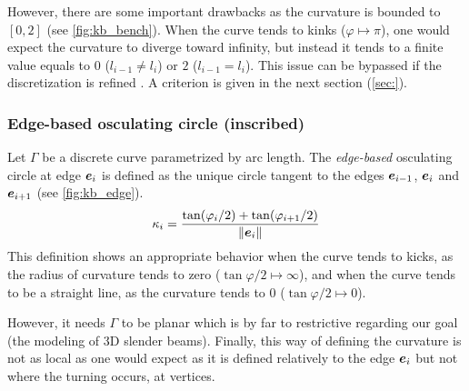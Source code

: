 However, there are some important drawbacks as the curvature is bounded to $[0,2]$ (see \cref{fig:kb_bench}). When the curve tends to kinks ($\varphi \mapsto \pi$), one would expect the curvature to diverge toward infinity, but instead it tends to a finite value equals to $0$ ($l_{i-1} \neq l_i$) or $2$ ($l_{i-1} = l_i$). This issue can be bypassed if the discretization is refined . A criterion is given in the next section (\cref{sec:}).


\subsubsection{Edge-based osculating circle (inscribed)}
Let $\Gamma$ be a discrete curve parametrized by arc length. The \emph{edge-based} osculating circle at edge $\boldsymbol{e}_{i}$ is defined as the unique circle tangent to the edges $\boldsymbol{e}_{i-1}$, $\boldsymbol{e}_{i}$ and $\boldsymbol{e}_{i+1}$ (see \cref{fig:kb_edge}).
\begin{equation}
	\kappa_i = \frac{\tan(\varphi_i/2) + \tan(\varphi_{i+1}/2)}{\lVert\boldsymbol{e}_{i}\rVert}
\label{eq:def_kb_edge}
\end{equation}
This definition shows an appropriate behavior when the curve tends to kicks, as the radius of curvature tends to zero ($\tan \varphi/2 \mapsto \infty$), and when the curve tends to be a straight line, as the curvature tends to $0$ ($\tan \varphi/2 \mapsto 0$).

However, it needs $\Gamma$ to be planar which is by far to restrictive regarding our goal (the modeling of 3D slender beams). Finally, this way of defining the curvature is not as local as one would expect as it is defined relatively to the edge $\boldsymbol{e}_{i}$ but not where the turning occurs, at vertices.

